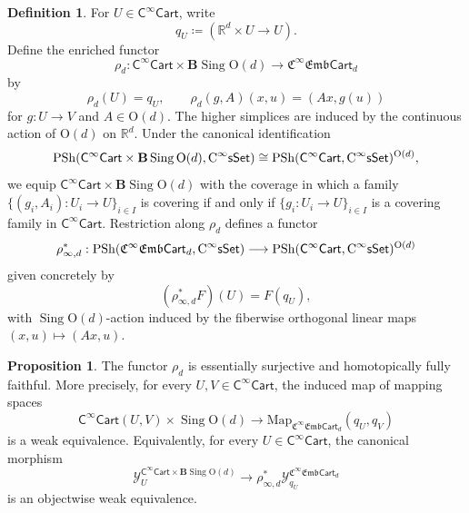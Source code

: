 \documentclass{amsart}
\newcommand{\cat}[1]{\mathsf{#1}}
\newcommand{\sset}{\cat{sSet}}
\DeclareMathOperator{\Sing}{Sing}
\newcommand{\CsSet}{\textnormal{C}^{\infty}\sset}
\newcommand{\Cart}{\cat{C}^{\infty}\cat{Cart}}
\newcommand{\fembcart}[1]{\mathfrak{C}^{\infty}\mathfrak{Emb}\cat{Cart}_{#1}}
\newcommand{\Map}{\mathrm{Map}}
\newcommand{\psh}{\mathrm{PSh}}
\newcommand{\RR}{{\mathbb{R}}}
\newcommand{\Yo}{\mathscr{Y}}
\theoremstyle{definition}
\newtheorem{definition}[equation]{Definition}
\newtheorem{proposition}[equation]{Proposition}
\numberwithin{equation}{subsection}
\numberwithin{subsubsection}{subsection}
\begin{document}
\begin{definition}\label{def:rho.equivalence}
  For \(U\in\Cart\), write
  \[
    q_U\coloneqq(\RR^d\times U\longrightarrow U).
  \]
  Define the enriched functor
  \[
    \rho_d:\Cart\times \mathbf{B}\Sing\mathrm{O}(d)
    \longrightarrow \fembcart{d}
  \]
  by
  \[
    \rho_d(U)=q_U,
    \qquad
    \rho_d(g,A)(x,u)=(Ax,g(u))
  \]
  for \(g:U\to V\) and \(A\in\mathrm{O}(d)\). The higher
  simplices are induced by the continuous action of \(\mathrm{O}(d)\) on
  \(\RR^d\). Under the canonical
  identification
  \[
    \psh(\Cart\times\mathbf{B}\Sing\mathrm{O}(d),\CsSet)
    \cong
    \psh(\Cart,\CsSet)^{\mathrm{O}(d)},
  \]
  we equip \(\Cart\times\mathbf{B}\Sing\mathrm{O}(d)\) with the coverage
  in which a family
  \(\{(g_i,A_i):U_i\to U\}_{i\in I}\) is covering if and only if
  \(\{g_i:U_i\to U\}_{i\in I}\) is a covering family in \(\Cart\).
  Restriction along \(\rho_d\) defines a functor
  \[
    \rho^{*}_{\infty,d} : \psh(\fembcart{d},\CsSet)\longrightarrow
    \psh(\Cart,\CsSet)^{\mathrm{O}(d)}
  \]
  given concretely by
  \[
    (\rho^{*}_{\infty,d} F)(U)=F(q_U),
  \]
  with \(\Sing\mathrm{O}(d)\)-action induced by the fiberwise orthogonal
  linear maps \((x,u)\mapsto(Ax,u)\).
\end{definition}

\begin{proposition}\label{prop:rho.on.representables}
  The functor \(\rho_d\) is essentially surjective and homotopically
  fully faithful. More precisely, for every \(U,V\in\Cart\), the induced map
  of mapping spaces
  \[
    \Cart(U,V)\times\Sing\mathrm{O}(d)
    \longrightarrow
    \Map_{\fembcart{d}}(q_U,q_V)
  \]
  is a weak equivalence. Equivalently, for every \(U\in\Cart\), the
  canonical morphism
  \[
    \Yo_U^{\Cart\times\mathbf{B}\Sing\mathrm{O}(d)}
    \longrightarrow
    \rho_{\infty,d}^{*}\Yo_{q_U}^{\fembcart{d}}
  \]
  is an objectwise weak equivalence.
\end{proposition}
\end{document}
